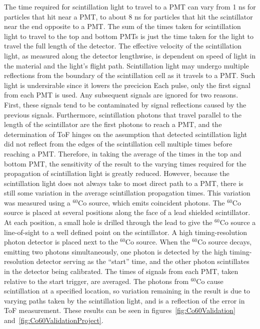 The time required for scintillation light to travel to a PMT can vary from 1 ns for particles that hit near a PMT, to about 8 ns for particles that hit the scintillator near the end opposite to a PMT.
The sum of the times taken for scintillation light to travel to the top and bottom PMTs is just the time taken for the light to travel the full length of the detector.
The effective velocity of the scintillation light, as measured along the detector lengthwise, is dependent on speed of light in the material and the light's flight path.
Scintillation light may undergo multiple reflections from the boundary of the scintillation cell as it travels to a PMT.
Such light is undersirable since it lowers the precicion
Each pulse, only the first signal from each PMT is used.
Any subsequent signals are ignored for two reasons.
First, these signals tend to be contaminated by signal reflections caused by the previous signals.
Furthermore, scintillation photons that travel parallel to the length of the scintillator are the first photons to reach a PMT, and the determination of ToF hinges on the assumption that detected scintillation light did not reflect from the edges of the scintillation cell multiple times before reaching a PMT.
Therefore, in taking the average of the times in the top and bottom PMT, the sensitivity of the result to the varying times required for the propagation of scintillation light is greatly reduced.
However, because the scintillation light does not always take to most direct path to a PMT, there is still some variation in the average scintillation propagation times.
This variation was measured using a $^{60}$Co source, which emits coincident photons.
The $^{60}$Co source is placed at several positions along the face of a lead shielded scintillator.
At each position, a small hole is drilled through the lead to give the $^{60}$Co source a line-of-sight to a well defined point on the scintillator.
A high timing-resolution photon detector is placed next to the $^{60}$Co source.
When the $^{60}$Co source decays, emitting two photons simultaneously, one photon is detected by the high timing-resolution detector serving as the ``start'' time, and the other photon scintillates in the detector being calibrated.
The times of signals from each PMT, taken relative to the start trigger, are averaged.
The photons from $^{60}$Co cause scintillation at a specified location, so variation remaining in the result is due to varying paths taken by the scintillation light, and is a reflection of the error in ToF measurement.
These results can be seen in figures~\ref{fig:Co60Validation} and~\ref{fig:Co60ValidationProject}.
